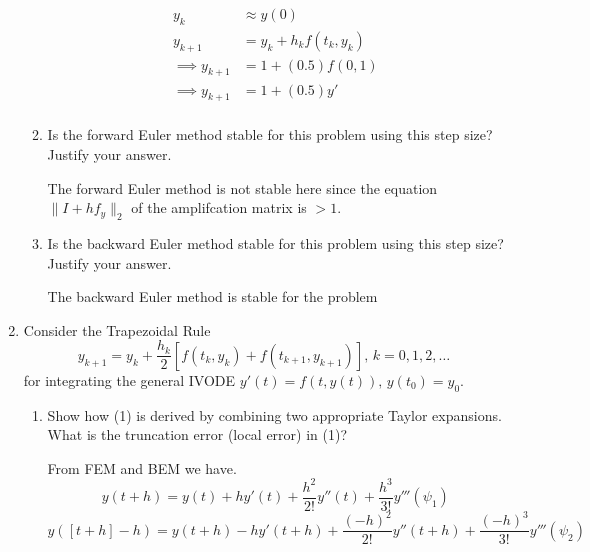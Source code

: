 \documentclass{article}
\newcommand{\twonorm}[1]{\| #1 \|_2}
\begin{document}
\begin{enumerate}
\begin{enumerate}
            \begin{align*} 
                y_k &\approx y(0) \\
                y_{k+1} &= y_k + h_kf(t_k,y_k) \\
                \implies y_{k+1} &= 1 + (0.5)f(0,1) \\
                \implies y_{k+1} &= 1 + (0.5)y' \\
            \end{align*}
            \item Is the forward Euler method stable for this problem using
                this step size? Justify your answer.
                
                The forward Euler method is not stable here since the
                equation $\twonorm{I + hf_y}$ of the amplifcation matrix
                is $> 1$.

            \item Is the backward Euler method stable for this problem using
                this step size? Justify your answer.

                The backward Euler method is stable for the problem
        \end{enumerate}
    \item Consider the Trapezoidal Rule
        \begin{equation}
            y_{k+1} = y_k + \frac{h_k}{2}[f(t_k,y_k) + f(t_{k+1}, y_{k+1})],
            \, k = 0,1,2,\dots
        \end{equation}
        for integrating the general IVODE $y'(t) = f(t,y(t)),\,
        y(t_0) = y_0$.
        \begin{enumerate}
            \item Show how (1) is derived by combining two appropriate 
                Taylor expansions. What is the truncation error (local 
                error) in (1)?
                
                From FEM and BEM we have.
               \[ y(t + h) = y(t) + hy'(t) + \frac{h^2}{2!} y''(t)
               + \frac{h^3}{3!}y'''(\psi_1)\]
               \[ y([t + h] - h) = y(t + h) - hy'(t + h) 
               + \frac{(-h)^2}{2!} y''(t+h) 
               + \frac{(-h)^3}{3!}y'''(\psi_2) \]
               

\end{enumerate}
\end{enumerate}
\end{document}
